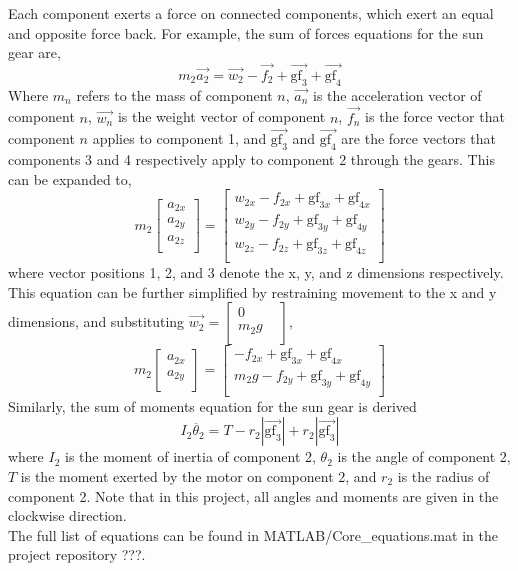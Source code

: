 Each component exerts a force on connected components, which exert an equal and opposite force back.
For example, the sum of forces equations for the sun gear are,\\
\begin{equation}
	m_2\vec{a_2} = \vec{w_2}-\vec{f_2}+\vec{\mathrm{gf}_3}+\vec{\mathrm{gf}_4}
\end{equation}
Where $m_n$ refers to the mass of component $n$, $\vec{a_n}$ is the acceleration vector of component $n$, $\vec{w_n}$ is the weight vector of component $n$, $\vec{f_n}$ is the force vector that component $n$ applies to component 1,  and $\vec{\mathrm{gf}_3}$ and $\vec{\mathrm{gf}_4}$ are the force vectors that components 3 and 4 respectively apply to component 2 through the gears.
This can be expanded to,
\begin{equation}
	m_2
	\begin{bmatrix}
		a_{2x}\\
		a_{2y}\\
		a_{2z}\\
	\end{bmatrix}
	=
	\begin{bmatrix}
		w_{2x}-f_{2x}+\mathrm{gf}_{3x}+\mathrm{gf}_{4x}\\
		w_{2y}-f_{2y}+\mathrm{gf}_{3y}+\mathrm{gf}_{4y}\\
		w_{2z}-f_{2z}+\mathrm{gf}_{3z}+\mathrm{gf}_{4z}\\
	\end{bmatrix}
\end{equation}
where vector positions 1, 2, and 3 denote the x, y, and z dimensions respectively. This equation can be further simplified by restraining movement to the x and y dimensions, and substituting $\vec{w_2} = \begin{bmatrix} 0 \\ m_2g & \\ \end{bmatrix}$,
\begin{equation}
	m_2
	\begin{bmatrix}
		a_{2x}\\
		a_{2y}\\
	\end{bmatrix}
	=
	\begin{bmatrix}
		-f_{2x}+\mathrm{gf}_{3x}+\mathrm{gf}_{4x}\\
		m_2g-f_{2y}+\mathrm{gf}_{3y}+\mathrm{gf}_{4y}\\
	\end{bmatrix}
\end{equation}
Similarly, the sum of moments equation for the sun gear is derived
\begin{equation}
	I_2\ddot{\theta_2} = T - r_2|\vec{\mathrm{gf}_3}| + r_2|\vec{\mathrm{gf}_3}|
\end{equation}
where $I_2$ is the moment of inertia of component 2, $\theta_2$ is the angle of component 2, $T$ is the moment exerted by the motor on component 2, and $r_2$ is the radius of component 2. Note that in this project, all angles and moments are given in the clockwise direction.
\\
The full list of equations can be found in MATLAB/Core\_equations.mat in the project repository ???.



